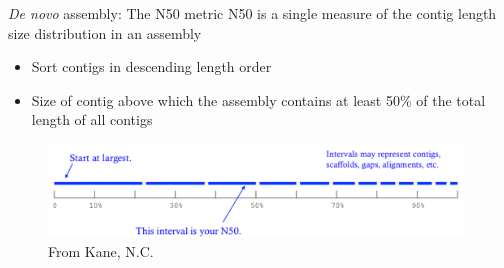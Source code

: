 \documentclass[presentation]{beamer}
\begin{document}
\begin{frame}[label=sec-3-1-3]{\emph{De novo} assembly: The N50 metric}
N50 is a single measure of the contig length size distribution in an assembly
\begin{itemize}
\item Sort contigs in descending length order
\item Size of contig above which the assembly contains at least 50\% of the
total length of all contigs
\end{itemize}

\begin{figure}[htb]
\centering
\includegraphics[width=11cm]{N50.png}
\caption{From Kane, N.C.}
\end{figure}
\end{frame}
\end{document}

